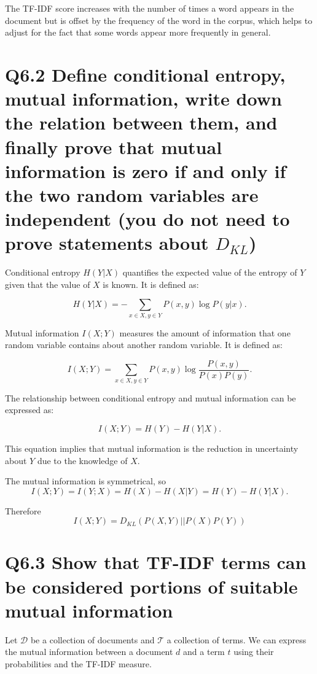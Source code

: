 \documentclass[11pt]{article}
\begin{document}
The TF-IDF score increases with the number of times a word appears in the document but is offset by the frequency of the word in the corpus, which helps to adjust for the fact that some words appear more frequently in general.

\section{Q6.2 Define conditional entropy, mutual information, write down the relation between them, and finally prove that mutual information is zero if and only if the two random variables are independent (you do not need to prove statements about $D_{KL}$)}

Conditional entropy $H(Y|X)$ quantifies the expected value of the entropy of $Y$ given that the value of $X$ is known. It is defined as:

\[
H(Y|X) = -\sum_{x \in X, y \in Y} P(x, y) \log P(y|x).
\]

Mutual information $I(X; Y)$ measures the amount of information that one random variable contains about another random variable. It is defined as:

\[
I(X; Y) = \sum_{x \in X, y \in Y} P(x, y) \log \frac{P(x, y)}{P(x)P(y)}.
\]

The relationship between conditional entropy and mutual information can be expressed as:

\[
I(X; Y) = H(Y) - H(Y|X).
\]

This equation implies that mutual information is the reduction in uncertainty about $Y$ due to the knowledge of $X$.

The mutual information is symmetrical, so
\[
I(X; Y) = I(Y; X) = H(X) - H(X|Y) = H(Y) - H(Y|X).
\]

Therefore
\[
    I(X;Y) = D_{KL}(P(X,Y)||P(X)P(Y))
\]

\section{Q6.3 Show that TF-IDF terms can be considered portions of suitable mutual information
}

Let $\mathcal{D}$ be a collection of documents and $\mathcal{T}$ a collection of terms. We can express the mutual information between a document $d$ and a term $t$ using their probabilities and the TF-IDF measure.
\end{document}
